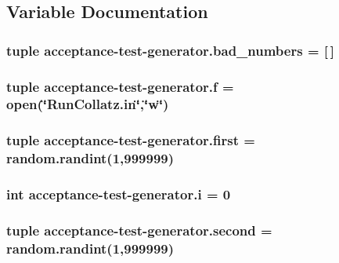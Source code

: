 \subsection{Variable Documentation}
\hypertarget{namespaceacceptance-test-generator_ad53ff9f7d71782d1865d93280abeb8a6}{
\subsubsection[{bad\-\_\-numbers}]{\setlength{\rightskip}{0pt plus 5cm}tuple acceptance-\/test-\/generator.\-bad\-\_\-numbers = \mbox{[}$\,$\mbox{]}}}\label{namespaceacceptance-test-generator_ad53ff9f7d71782d1865d93280abeb8a6}
\hypertarget{namespaceacceptance-test-generator_ab6bd3d00ba498096feb3cfec3107dbbf}{
\subsubsection[{f}]{\setlength{\rightskip}{0pt plus 5cm}tuple acceptance-\/test-\/generator.\-f = open(\char`\"{}Run\-Collatz.\-in\char`\"{},\char`\"{}w\char`\"{})}}\label{namespaceacceptance-test-generator_ab6bd3d00ba498096feb3cfec3107dbbf}
\hypertarget{namespaceacceptance-test-generator_ad138dc10eef77c4fd3af95e6074cce15}{
\subsubsection[{first}]{\setlength{\rightskip}{0pt plus 5cm}tuple acceptance-\/test-\/generator.\-first = random.\-randint(1,999999)}}\label{namespaceacceptance-test-generator_ad138dc10eef77c4fd3af95e6074cce15}
\hypertarget{namespaceacceptance-test-generator_a1d577d018a80b654fc60ead446833608}{
\subsubsection[{i}]{\setlength{\rightskip}{0pt plus 5cm}int acceptance-\/test-\/generator.\-i = 0}}\label{namespaceacceptance-test-generator_a1d577d018a80b654fc60ead446833608}
\hypertarget{namespaceacceptance-test-generator_a1b19b963dafdf85225cef301ebeabde7}{
\subsubsection[{second}]{\setlength{\rightskip}{0pt plus 5cm}tuple acceptance-\/test-\/generator.\-second = random.\-randint(1,999999)}}\label{namespaceacceptance-test-generator_a1b19b963dafdf85225cef301ebeabde7}
